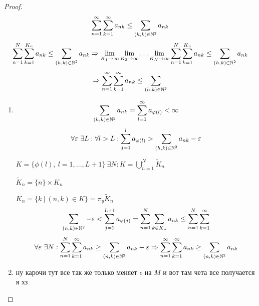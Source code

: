     \begin{proof}
        \[
            \sum_{n=1}^\infty \sum_{k=1}^\infty a_{nk} \le \sum_{(h, k) \in \mathbb{N}^2} a_{nk}    
        \]
        \[
            \sum_{n=1}^N \sum_{k=1}^{K_n} a_{nk} \le \sum_{(h, k) \in \mathbb{N}^2} a_{nk} \Rightarrow \lim_{K_1 \rightarrow \infty} 
            \lim_{K_2 \rightarrow \infty} \dots \lim_{K_N \rightarrow \infty} \sum_{n=1}^N \sum_{k=1}^{K_n} a_{nk} \le \sum_{(h, k) \in \mathbb{N}^2} a_{nk}
        \]
        \[
            \Rightarrow \sum_{n=1}^\infty \sum_{k=1}^\infty a_{nk} \le \sum_{(h, k) \in \mathbb{N}^2}    
        \]

        \begin{enumerate}
            \item \[
                \sum_{(h, k) \in \mathbb{N}^2} a_{nk} = \sum_{l = 1}^\infty a_{\varphi(l)} < \infty    
            \]
            \[
                \forall \varepsilon \ \exists L : \forall l > L : \sum_{j=1}^l a_{\varphi(l)} > \sum_{(h, k) \in \mathbb{N}^2} a_{nk}  - \varepsilon   
            \]
            \par $K = \{\phi(l), \ l = 1, \dots, L + 1\} \ \exists N : K = \bigcup_{n=1}^N \tilde K_n$
            \par $\tilde K_n = \{n\} \times K_n$
            \par $K_n = \{k \ | \ (n, k) \in K\} = \pi_y \tilde K_n$
            \[
                \sum_{(n, k) \in \mathbb{N}^2} - \varepsilon< \sum_{j=1}^{L+1} a_{\varphi(j)} = \sum_{n=1}^N \sum_{k \in K_n} a_{nk} \le \sum_{n=1}^N \sum_{k=1}^\infty    
            \]
            \[
                \forall \varepsilon \ \exists N : \sum_{n=1}^N \sum_{k=1}^\infty a_{nk} \ge \sum_{(n, k) \in \mathbb{N}^2} a_{nk} - \varepsilon \Rightarrow \sum_{n=1}^\infty \sum_{k=1}^\infty a_{nk} \ge \sum_{(n, k) \in \mathbb{N}^2} a_{nk}
            \]
            \item ну карочи тут все так же только меняет  $\epsilon$ на $M$ и вот там чета все получается я хз  
        \end{enumerate}
    \end{proof}
    
